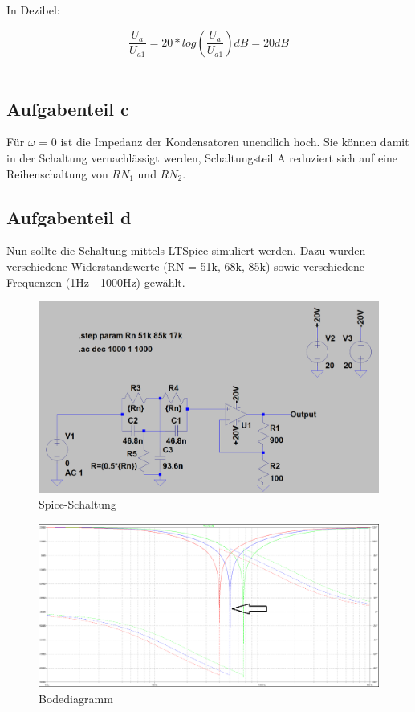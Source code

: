 \documentclass[%
  a4paper, %
  12pt, %
   article, %
  titlepage
]{scrartcl}
\begin{document}
In Dezibel:

\begin{equation}
\frac{U_{a}}{U_{a1}} = 20 * log(\frac{U_{a}}{U_{a1}})dB = 20dB
\end{equation}\

\subsection{Aufgabenteil c}

Für $\omega$ = 0 ist die Impedanz der Kondensatoren unendlich hoch. Sie können damit in der Schaltung vernachlässigt werden, Schaltungsteil A reduziert sich auf eine Reihenschaltung von 
$RN_{1}$ und $RN_{2}$.

\clearpage

\subsection{Aufgabenteil d}

Nun sollte die Schaltung mittels LTSpice simuliert werden. Dazu wurden verschiedene Widerstandswerte
(RN = 51k, 68k, 85k) sowie verschiedene Frequenzen (1Hz - 1000Hz) gewählt.

\begin{figure}[h]
\includegraphics[width=\textwidth]{schematic2.png}
\caption{Spice-Schaltung}
\label{fig1}
\end{figure}

\clearpage

\begin{figure}[h]
\includegraphics[width=\textwidth]{plot1.png}
\caption{Bodediagramm}
\label{fig2}
\end{figure}
\end{document}
